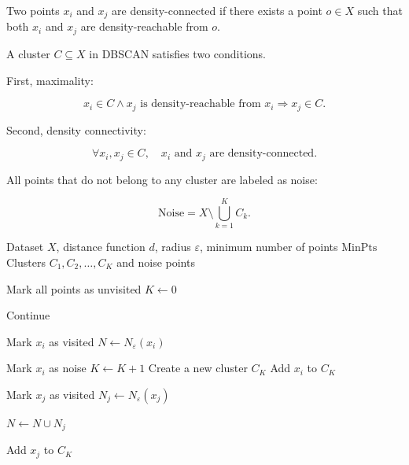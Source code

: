 \documentclass[a4paper]{article}
\begin{document}
    Two points \(x_i\) and \(x_j\) are density-connected if there exists a point \(o \in X\) such that both \(x_i\) and \(x_j\) are density-reachable from \(o\).
    
    A cluster \(C \subseteq X\) in DBSCAN satisfies two conditions.
    
    First, maximality:
    
    \[
        x_i \in C
        \land
        x_j \text{ is density-reachable from } x_i
        \Rightarrow
        x_j \in C.
    \]
    
    Second, density connectivity:
    
    \[
        \forall x_i, x_j \in C,
        \quad
        x_i \text{ and } x_j \text{ are density-connected}.
    \]
    
    All points that do not belong to any cluster are labeled as noise:
    
    \[
        \mathrm{Noise}
        =
        X \setminus \bigcup_{k=1}^{K} C_k.
    \]
    
    \begin{algorithm}
        \caption{DBSCAN}
        \begin{algorithmic}[1]
            \Require Dataset \(X\), distance function \(d\), radius \(\varepsilon\), minimum number of points \(\mathrm{MinPts}\)
            \Ensure Clusters \(C_1, C_2, \dots, C_K\) and noise points
            
            \State Mark all points as unvisited
            \State \(K \gets 0\)
            
                    \State Continue
                \EndIf
                
                \State Mark \(x_i\) as visited
                \State \(N \gets N_{\varepsilon}(x_i)\)
                
                    \State Mark \(x_i\) as noise
                \Else
                    \State \(K \gets K + 1\)
                    \State Create a new cluster \(C_K\)
                    \State Add \(x_i\) to \(C_K\)
                    
                            \State Mark \(x_j\) as visited
                            \State \(N_j \gets N_{\varepsilon}(x_j)\)
                            
                                \State \(N \gets N \cup N_j\)
                            \EndIf
                        \EndIf
                        
                            \State Add \(x_j\) to \(C_K\)
                        \EndIf
                    \EndFor
                \EndIf
            \EndFor
        \end{algorithmic}
    \end{algorithm}
    \nocite{*}
    
    
\end{document}
